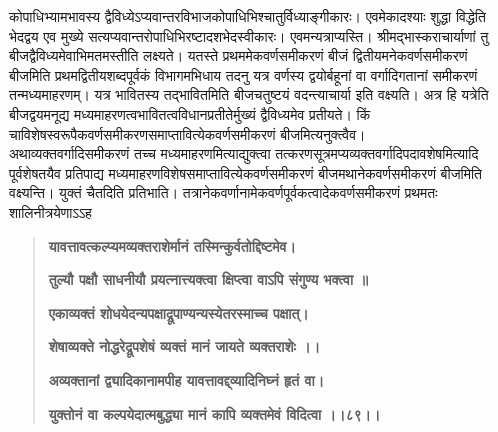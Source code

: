 \documentclass[11pt, openany]{book}
\begin{document}
\vspace{5mm}

\begin{sloppypar}
\hangindent=0.2in कोपाधिभ्यामभावस्य द्वैविध्येऽप्यवान्तरविभाजकोपाधिभिश्चातुर्विध्याङ्गीकारः। एवमेकादश्याः शुद्धा विद्धेति भेदद्वय एव मुख्ये सत्यप्यवान्तरोपाधिभिरष्टादशभेदस्वीकारः। एवमन्यत्राप्यस्ति। श्रीमद्भास्कराचार्याणां तु बीजद्वैविध्यमेवाभिमतमस्तीति लक्ष्यते। यतस्ते प्रथममेकवर्णसमीकरणं बीजं द्वितीयमनेकवर्णसमीकरणं बीजमिति प्रथमद्वितीयशब्दपूर्वकं विभागमभिधाय तदनु यत्र वर्णस्य द्वयोर्बहूनां वा वर्गादिगतानां समीकरणं तन्मध्यमाहरणम्। यत्र भावितस्य तद्भावितमिति बीजचतुष्टयं वदन्त्याचार्या इति वक्ष्यति। अत्र हि यत्रेति बीजद्वयमनूद्य मध्यमाहरणत्वभावितत्वविधानप्रतीतेर्मुख्यं द्वैविध्यमेव प्रतीयते। किं चाविशेषस्वरूपैकवर्णसमीकरणसमाप्तावित्येकवर्णसमीकरणं बीजमित्यनुक्त्वैव।\\

\hangindent=0.2in \hspace{0.2in}अथाव्यक्तवर्गादिसमीकरणं तच्च मध्यमाहरणमित्याद्युक्त्वा तत्करणसूत्रमप्यव्यक्तवर्गादिपदावशेषमित्यादि पूर्वशेषतयैव प्रतिपाद्य मध्यमाहरणविशेषसमाप्तावित्येकवर्णसमीकरणं बीजमथानेकवर्णसमीकरणं बीजमिति वक्ष्यन्ति। युक्तं चैतदिति प्रतिभाति। तत्रानेकवर्णानामेकवर्णपूर्वकत्वादेकवर्णसमीकरणं प्रथमतः शालिनीत्रयेणाऽऽह\textendash

\begin{quote}
\hspace{1in}\textbf{यावत्तावत्कल्प्यमव्यक्तराशेर्मानं तस्मिन्कुर्वतोद्दिष्टमेव।}

\hspace{1in}\textbf{तुल्यौ पक्षौ साधनीयौ प्रयत्नात्त्यक्त्वा क्षिप्त्वा वाऽपि संगुण्य भक्त्वा ॥}

\hspace{1in}\textbf{एकाव्यक्तं शोधयेदन्यपक्षाद्रूपाण्यन्यस्येतरस्माच्च पक्षात्।}

\hspace{1in}\textbf{शेषाव्यक्ते नोद्धरेद्रूपशेषं व्यक्तं मानं जायते व्यक्तराशेः ।।}

\hspace{1in}\textbf{अव्यक्तानां द्व्यादिकानामपीह यावत्तावद्द्व्यादिनिघ्नं हृतं वा।}

\hspace{1in}\textbf{युक्तोनं वा कल्पयेदात्मबुद्ध्या मानं कापि व्यक्तमेवं विदित्वा ।।८९।।}
\end{quote}


\end{sloppypar}
\end{document}
